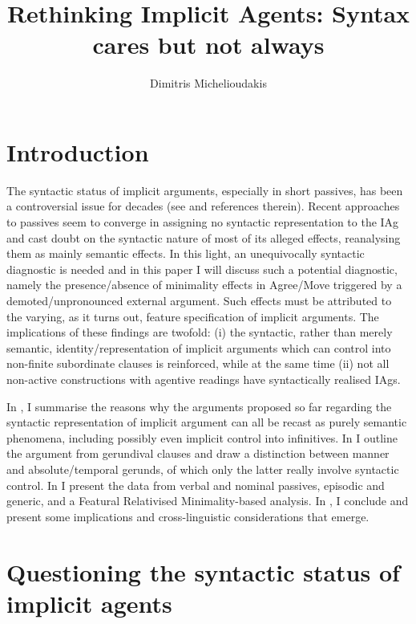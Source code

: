 \documentclass[output=paper]{langsci/langscibook}
\author{Dimitris Michelioudakis\affiliation{Aristotle University of Thessaloniki}}
\title{Rethinking Implicit Agents: Syntax cares but not always}
\begin{document}
\glsresetall

\section{Introduction}\label{sec:key:22.1}

The syntactic status of implicit arguments, especially in short
passives, has been a controversial issue for decades (see
\citealt{Roberts1985,Roberts:1987a,Jaeggli1986,Roeper1984,Williams1985,Williams1987,BhattPancheva2006}
and references therein). Recent approaches to passives
\parencite[e.g.][]{Bruening2014,Schafer2012b,AlexiadouEtAl2015} seem to converge
in assigning no syntactic representation to the \gls{IAg} and cast doubt on the
syntactic nature of most of its alleged effects, reanalysing them as mainly
semantic effects. In this light, an unequivocally syntactic diagnostic is
needed and in this paper I will discuss such a potential diagnostic, namely the
presence/absence of minimality effects in Agree/Move triggered by a
demoted/unpronounced external argument. Such effects must be attributed to the
varying, as it turns out, feature specification of implicit arguments. The
implications of these findings are twofold: (i) the syntactic, rather than
merely semantic, identity/representation of implicit arguments which can
control into non-finite subordinate clauses is reinforced, while at the same
time (ii) not all non-active constructions with agentive readings have
syntactically realised \glspl{IAg}.

In , I summarise the reasons why the arguments proposed so
far regarding the syntactic representation of implicit argument can all be recast as purely semantic phenomena, including possibly
even implicit control into infinitives. In
 I outline the argument from  gerundival clauses
and draw a distinction between manner and absolute/temporal gerunds, of which
only the latter really involve syntactic control. In  I
present the data from verbal and nominal passives, episodic and
generic, and a Featural Relativised Minimality-based analysis. In
, I conclude and present some implications and
cross-linguistic considerations that emerge.

\section{Questioning the syntactic status of implicit
agents}\label{sec:key:22.2}
\end{document}
